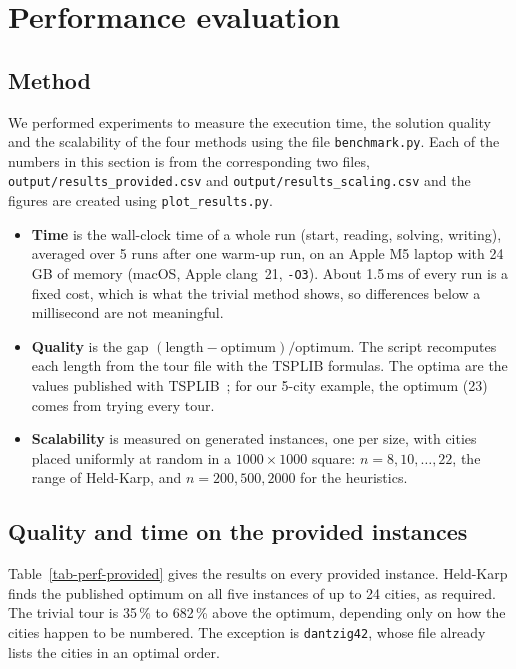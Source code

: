 \documentclass[10pt,a4paper]{article}
\makeatletter
\let\tsp@section\section
\renewcommand{\section}{\FloatBarrier\tsp@section}
\makeatother
\begin{document}
\section{Performance evaluation}\label{sec-perf}

\subsection{Method}

We performed experiments to measure the execution time, the solution quality and the scalability of the four methods using the file \texttt{benchmark.py}. Each of the numbers in this section is from the corresponding two files, \texttt{output/results\_provided.csv} and \texttt{output/results\_scaling.csv} and the figures are created using \texttt{plot\_results.py}.
\begin{itemize}
  \item \textbf{Time} is the wall-clock time of a whole run (start, reading, solving, writing), averaged over 5 runs after one warm-up run, on an Apple M5 laptop with 24\,GB of memory (macOS, Apple clang~21, \texttt{-O3}). About 1.5\,ms of every run is a fixed cost, which is what the trivial method shows, so differences below a millisecond are not meaningful.
  \item \textbf{Quality} is the gap $(\mathrm{length} - \mathrm{optimum}) / \mathrm{optimum}$. The script recomputes each length from the tour file with the TSPLIB formulas. The optima are the values published with TSPLIB~\cite{tsplib}; for our 5-city example, the optimum (23) comes from trying every tour.
  \item \textbf{Scalability} is measured on generated instances, one per size, with cities placed uniformly at random in a $1000 \times 1000$ square: $n = 8, 10, \dots, 22$, the range of Held-Karp, and $n = 200, 500, 2000$ for the heuristics.
\end{itemize}

\subsection{Quality and time on the provided instances}

Table~\ref{tab-perf-provided} gives the results on every provided instance. Held-Karp finds the published optimum on all five instances of up to 24 cities, as required. The trivial tour is 35\,\% to 682\,\% above the optimum, depending only on how the cities happen to be numbered. The exception is \texttt{dantzig42}, whose file already lists the cities in an optimal order.
\end{document}
